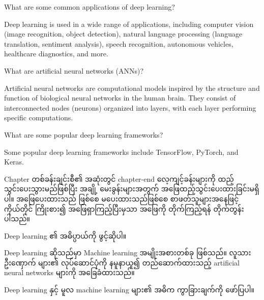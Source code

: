 \begin{question}
   What are some common applications of deep learning?
\end{question}

\begin{answer}
    Deep learning is used in a wide range of applications, including computer vision (image recognition, object detection), natural language processing (language translation, sentiment analysis), speech recognition, autonomous vehicles, healthcare diagnostics, and more.
\end{answer}

\begin{question}
   What are artificial neural networks (ANNs)?
\end{question}
\begin{answer}
    Artificial neural networks are computational models inspired by the structure and function of biological neural networks in the human brain. They consist of interconnected nodes (neurons) organized into layers, with each layer performing specific computations.
\end{answer}

\begin{question}
   What are some popular deep learning frameworks?
\end{question}
\begin{answer}
    Some popular deep learning frameworks include TensorFlow, PyTorch, and Keras.
\end{answer}

\newpage
Chapter တစ်ခန်းချင်းစီ၏ အဆုံးတွင် chapter-end လေ့ကျင့်ခန်းများကို ထည့်သွင်းပေးသွားမည်ဖြစ်ပြီး အချို့ မေးခွန်းများအတွက်  အဖြေထည့်သွင်းပေးထားခြင်းမရှိပါ။ အဖြေပေးထားသည် ဖြစ်စေ မပေးထားသည်ဖြစ်စေ စာဖတ်သူများအနေဖြင့် ကိုယ်တိုင် ကြိုးစား၍ အဖြေရှာကြည့်ပြီးမှသာ အဖြေကို တိုက်ကြည့်ရန် တိုက်တွန်းပါသည်။

\begin{question}
    Deep learning ၏ အဓိပ္ပာယ်ကို ဖွင့်ဆိုပါ။
\end{question}

\begin{answer}
    Deep learning ဆိုသည်မှာ  Machine learning အမျိုးအစားတစ်ခု ဖြစ်သည်။ လူသား ဦးဏှောက် များ၏ လုပ်ဆောင်ပုံကို နမူနာယူ၍ တည်ဆောက်ထားသည့် artificial neural networks များကို အခြေခံထားသည်။
\end{answer}

\begin{question}
     Deep learning နှင့် မူလ machine learning များ၏ အဓိက ကွာခြားချက်ကို ဖော်ပြပါ။
\end{question}

